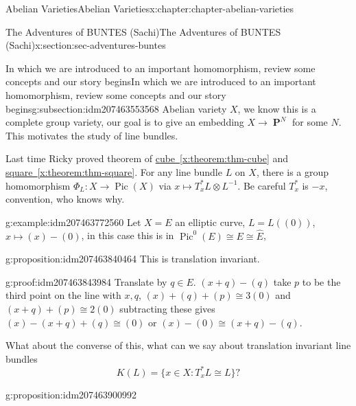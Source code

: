 \documentclass[oneside,10pt,]{book}
\numberwithin{equation}{section}
\DeclareMathOperator{\Pic}{Pic}
\DeclareMathOperator{\PP}{\mathbf{P}}
\begin{document}
\begin{chapterptx}{Abelian Varieties}{}{Abelian Varieties}{}{}{x:chapter:chapter-abelian-varieties}
\typeout{************************************************}
%
\begin{sectionptx}{The Adventures of BUNTES (Sachi)}{}{The Adventures of BUNTES (Sachi)}{}{}{x:section:sec-adventures-buntes}
%
%
\typeout{************************************************}
\typeout{************************************************}
%
\begin{subsectionptx}{In which we are introduced to an important homomorphism, review some concepts and our story begins}{}{In which we are introduced to an important homomorphism, review some concepts and our story begins}{}{}{g:subsection:idm207463553568}
Abelian variety  \(X\), we know this is a complete group variety, our goal is to give an embedding \(X\to \PP^N\) for some \(N\). This motivates the study of line bundles.%
\par
Last time Ricky proved theorem of \hyperref[x:theorem:thm-cube]{cube~\ref{x:theorem:thm-cube}} and \hyperref[x:theorem:thm-square]{square~\ref{x:theorem:thm-square}}. For any line bundle  \(L\) on \(X\), there is a group homomorphism \(\Phi_L\colon X \to \Pic(X)\) via \(x\mapsto T_x^* L\otimes L^{-1}\). Be careful \(T_x^*\) is \(-x\), convention, who knows why.%
\begin{example}{}{g:example:idm207463772560}%
Let \(X =E\) an elliptic curve, \(L = L((0))\), \(x\mapsto (x) - (0)\), in this case this is in \(\Pic^0(E) \cong E \cong \widehat E\),%
\end{example}
\begin{proposition}{}{}{g:proposition:idm207463840464}%
This is translation invariant.%
\end{proposition}
\begin{proofptx}{}{g:proof:idm207463843984}
Translate by \(q\in E\). \((x+q) - (q)\) take \(p\) to be the third point on the line with \(x,q\), \((x) + (q) + (p) \cong 3(0)\) and \((x+q) + (p) \cong 2 (0)\) subtracting these gives \((x) - (x+q) +(q) \cong (0)\) or \((x) - (0) \cong (x+q) -(q)\).%
\end{proofptx}
What about the converse of this, what can we say about translation invariant line bundles%
\begin{equation*}
K(L) = \{x\in X : T_x^* L \cong L\}\text{?}
\end{equation*}
%
\begin{proposition}{}{}{g:proposition:idm207463900992}%

\end{proposition}
\end{subsectionptx}
\end{sectionptx}
\end{chapterptx}
\end{document}
